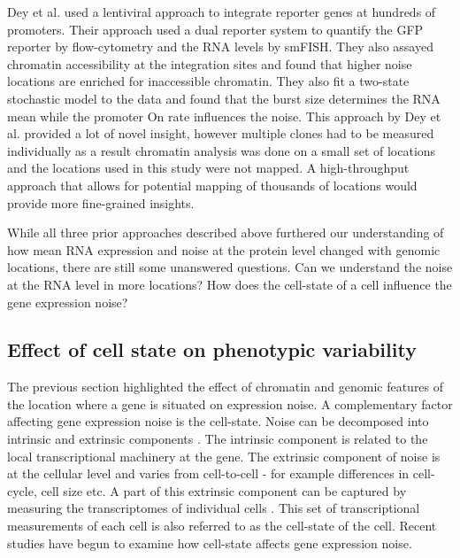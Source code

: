 Dey et al. \cite{Dey} used a lentiviral approach to integrate reporter genes at hundreds of promoters. Their approach used a dual reporter system to quantify the GFP reporter by flow-cytometry and the RNA levels by smFISH. They also assayed chromatin accessibility at the integration sites and found that higher noise locations are enriched for inaccessible chromatin. They also fit a two-state stochastic model to the data and found that the burst size determines the RNA mean while the promoter On rate influences the noise. This approach by Dey et al. provided a lot of novel insight, however multiple clones had to be measured individually as a result chromatin analysis was done on a small set of locations and the locations used in this study were not mapped. A high-throughput approach that allows for potential mapping of thousands of locations would provide more fine-grained insights.

While all three prior approaches described above furthered our understanding of how mean RNA expression and noise at the protein level changed with genomic locations, there are still some unanswered questions. Can we understand the noise at the RNA level in more locations? How does the cell-state of a cell influence the gene expression noise?

\subsection{Effect of cell state on phenotypic variability}

The previous section highlighted the effect of chromatin and genomic features of the location where a gene is situated on expression noise. A complementary factor affecting gene expression noise is the cell-state. Noise can be decomposed into intrinsic and extrinsic components \cite{elowitz} \cite{oshea}. The intrinsic component is related to the local transcriptional machinery at the gene. The extrinsic component of noise is at the cellular level and varies from cell-to-cell - for example differences in cell-cycle, cell size etc. A part of this extrinsic component can be captured by measuring the transcriptomes of individual cells \cite{dropseq}. This set of transcriptional measurements of each cell is also referred to as the cell-state of the cell. Recent studies have begun to examine how cell-state affects gene expression noise.

